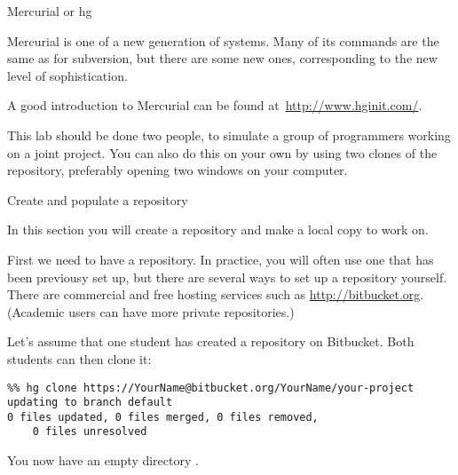
 {Mercurial or hg}

Mercurial is one of a new generation of  systems. Many of its commands are the same as for subversion,
but there are some new ones, corresponding to the new level of 
sophistication.

A good introduction to Mercurial can be found
at~\url{http://www.hginit.com/}.

This lab should be done two people, to simulate a group
of programmers working on a joint project. You can also do this on
your own by using two clones of the repository, 
preferably opening two windows on your computer.

 {Create and populate a repository}

\begin{purpose}
  In this section you will create a repository and make a local copy
  to work on.
\end{purpose}

First we need to have a repository. In practice, you will often use
one that has been previousy set up, but there are several ways to
set up a repository yourself.
There are commercial and free hosting services such as
  \url{http://bitbucket.org}. (Academic users can have more private
  repositories.)

Let's assume that one student has created a repository 
on Bitbucket. Both students can then clone it:
\begin{verbatim}
%% hg clone https://YourName@bitbucket.org/YourName/your-project
updating to branch default
0 files updated, 0 files merged, 0 files removed, 
    0 files unresolved
\end{verbatim}
You now have an empty directory .

